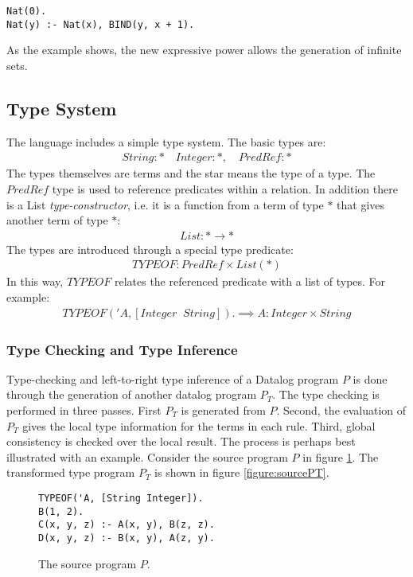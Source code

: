 \begin{verbatim}
Nat(0).
Nat(y) :- Nat(x), BIND(y, x + 1).
\end{verbatim}
\noindent
As the example shows, the new expressive power allows the generation of infinite sets. 

\subsection{Type System}
The language includes a simple type system. The basic types are:
\begin{align*}
	String : * \quad Integer : *, \quad PredRef : * 
\end{align*}
\noindent
The types themselves are terms and the star means the type of a type. The $PredRef$ type is used to reference predicates within a relation. In addition there is a List \textit{type-constructor}, i.e. it is a function from a term of type $*$ that gives another term of type $*$:
\begin{align*}
	List : * \rightarrow *
\end{align*}
\noindent
The types are introduced through a special type predicate:
\begin{align*}
	TYPEOF : PredRef \times List(*)
\end{align*}
In this way, $TYPEOF$ relates the referenced predicate with a list of types. For example:
\begin{align*}
	TYPEOF('A, [Integer\;\;String]). \implies A : Integer \times String
\end{align*}

\subsubsection{Type Checking and Type Inference}
Type-checking and left-to-right type inference of a Datalog program $P$ is done through the generation of another datalog program $P_T$. The type checking is performed in three passes. First $P_T$ is generated from $P$. Second, the evaluation of $P_T$ gives the local type information for the terms in each rule. Third, global consistency is checked over the local result. The process is perhaps best illustrated with an example. Consider the source program $P$ in figure \ref{figure:sourceP}. The transformed type program $P_T$ is shown in figure \ref{figure:sourcePT}.
\begin{figure}[!ht]
\begin{verbatim}
TYPEOF('A, [String Integer]).
B(1, 2).
C(x, y, z) :- A(x, y), B(z, z).
D(x, y, z) :- B(x, y), A(z, y).
\end{verbatim}
\caption{The source program $P$.}
\label{figure:sourceP}
\end{figure}

